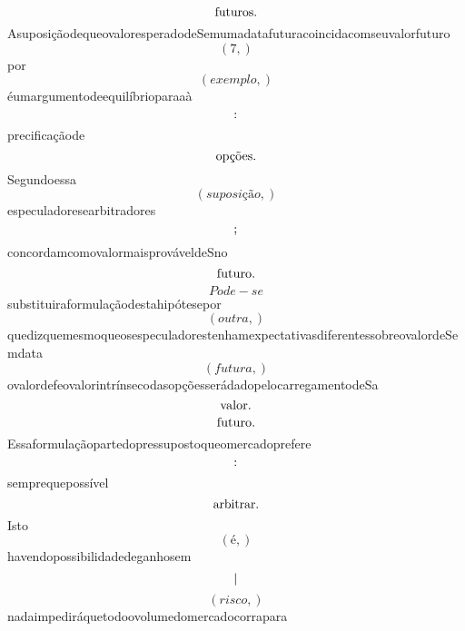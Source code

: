 \documentclass{article}
\begin{document}
\begin{equation}
$futuros.$
\end{equation}AsuposiçãodequeovaloresperadodeSemumadatafuturacoincidacomseuvalorfuturo\begin{equation}
\left( 7,\right)
\end{equation}por\begin{equation}
\left( exemplo,\right)
\end{equation}éumargumentodeequilíbrioparaaà\begin{equation}
$:$
\end{equation}precificaçãode\begin{equation}
$opções.$
\end{equation}Segundoessa\begin{equation}
\left( suposição,\right)
\end{equation}especuladoresearbitradores\begin{equation}
$;$
\end{equation}concordamcomovalormaisprováveldeSno\begin{equation}
$futuro.$
\end{equation}\begin{equation}
Pode - se
\end{equation}substituiraformulaçãodestahipótesepor\begin{equation}
\left( outra,\right)
\end{equation}quedizquemesmoqueosespeculadorestenhamexpectativasdiferentessobreovalordeSemdata\begin{equation}
\left( futura,\right)
\end{equation}ovalordefeovalorintrínsecodasopçõesserádadopelocarregamentodeSa\begin{equation}
$valor.$
\end{equation}\begin{equation}
$futuro.$
\end{equation}Essaformulaçãopartedopressupostoqueomercadoprefere\begin{equation}
$:$
\end{equation}semprequepossível\begin{equation}
$arbitrar.$
\end{equation}Isto\begin{equation}
\left( é,\right)
\end{equation}havendopossibilidadedeganhosem\begin{equation}
$|$
\end{equation}\begin{equation}
\left( risco,\right)
\end{equation}nadaimpediráquetodoovolumedomercadocorrapara\begin{equation}

\end{equation}
\end{document}
